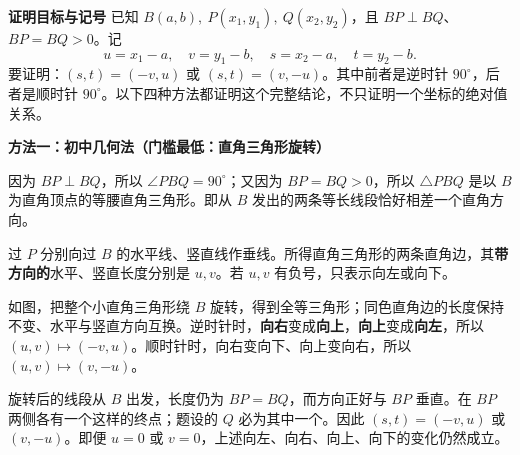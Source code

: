 \newpage
\begin{proofbox}
    \textbf{\textcolor{CProof}{证明目标与记号}}
    已知 $B(a,b),\ P(x_1,y_1),\ Q(x_2,y_2)$，且 $BP\perp BQ$、$BP=BQ>0$。记
    \[
       u=x_1-a,\quad v=y_1-b,\quad s=x_2-a,\quad t=y_2-b.
    \]
    要证明：$(s,t)=(-v,u)$ 或 $(s,t)=(v,-u)$。其中前者是逆时针 $90^\circ$，后者是顺时针 $90^\circ$。以下四种方法都证明这个完整结论，不只证明一个坐标的绝对值关系。

    \medskip
    \textbf{\textcolor{CProof}{方法一：初中几何法（门槛最低：直角三角形旋转）}}

    \begin{description}[style=nextline,leftmargin=2.8em,labelsep=0.5em,itemsep=0.42em]
        \item[\textbf{第1步（认出等腰直角三角形）}]
            因为 $BP\perp BQ$，所以 $\angle PBQ=90^\circ$；又因为 $BP=BQ>0$，所以 $\triangle PBQ$ 是以 $B$ 为直角顶点的等腰直角三角形。即从 $B$ 发出的两条等长线段恰好相差一个直角方向。
        \item[\textbf{第2步（把 $B$ 当成临时的起点）}]
            过 $P$ 分别向过 $B$ 的水平线、竖直线作垂线。所得直角三角形的两条直角边，其\textbf{带方向的}水平、竖直长度分别是 $u,v$。若 $u,v$ 有负号，只表示向左或向下。
        \item[\textbf{第3步（旋转整个小直角三角形）}]
            如图，把整个小直角三角形绕 $B$ 旋转，得到全等三角形；同色直角边的长度保持不变、水平与竖直方向互换。逆时针时，\textbf{向右}变成\textbf{向上}，\textbf{向上}变成\textbf{向左}，所以 $(u,v)\mapsto(-v,u)$。顺时针时，向右变向下、向上变向右，所以 $(u,v)\mapsto(v,-u)$。
        \item[\textbf{第4步（为什么终点就是 $Q$）}]
            旋转后的线段从 $B$ 出发，长度仍为 $BP=BQ$，而方向正好与 $BP$ 垂直。在 $BP$ 两侧各有一个这样的终点；题设的 $Q$ 必为其中一个。因此 $(s,t)=(-v,u)$ 或 $(v,-u)$。即便 $u=0$ 或 $v=0$，上述向左、向右、向上、向下的变化仍然成立。
    \end{description}


\end{proofbox}
